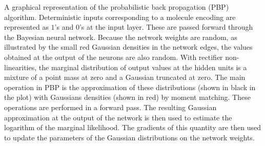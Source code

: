 A graphical representation of the probabilistic back propagation (PBP)
algorithm. Deterministic inputs corresponding to a molecule encoding are represented as $1$'s and $0$'s at the input
layer. These are passed forward through the Bayesian neural network. Because the network weights are random, as illustrated
by the small red Gaussian densities in the network edges, the values obtained at the output of the
neurons are also random. With rectifier non-linearities, the marginal distribution of output values at the hidden units is a mixture
of a point mass at zero and a Gaussian truncated at zero. 
The main operation in PBP is the approximation of
these distributions (shown in black in the plot) with Gaussians densities (shown in red) by moment matching. These
operations are performed in a forward pass. The resulting Gaussian
approximation at the output of the network is then used to estimate the
logarithm of the marginal likelihood. The gradients of this quantity are then
used to update the parameters of the Gaussian distributions on the network
weights.
\label{fig:pbp}